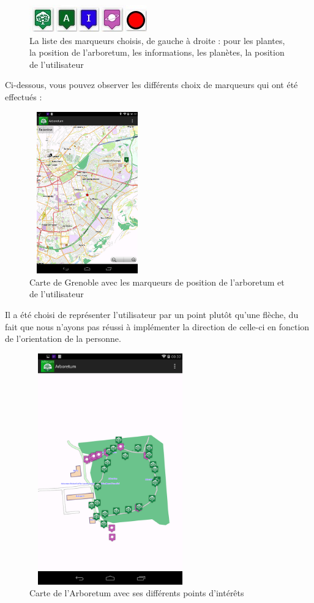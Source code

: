 \documentclass[a4paper,11pt]{article}
\begin{document}
		 \begin{figure}[H]
     \begin{center}
      \includegraphics{listemarker.jpg}
      \caption{La liste des marqueurs choisis, de gauche à droite : pour les plantes, la position de l'arboretum, les informations, les planètes, la position de l'utilisateur}
     \end{center}
    \end{figure}
			
			Ci-dessous, vous pouvez observer les différents choix de marqueurs qui ont été effectués : %
    \begin{figure}[H]
     \begin{center}
      \includegraphics[width=5cm,height=7cm]{grenoble.png}
      \caption{Carte de Grenoble avec les marqueurs de position de l'arboretum et de l'utilisateur}
     \end{center}
    \end{figure}
			Il a été choisi de représenter l'utilisateur par un point plutôt qu'une flèche, du fait que nous n'ayons pas réussi à implémenter la direction de celle-ci en fonction de l'orientation de la personne.
     \begin{figure}[H]
     \begin{center}
      \includegraphics[width=7cm,height=10cm]{arbo.png}
      \caption{Carte de l'Arboretum avec ses différents points d'intérêts}
     \end{center}
    \end{figure}
\end{document}
